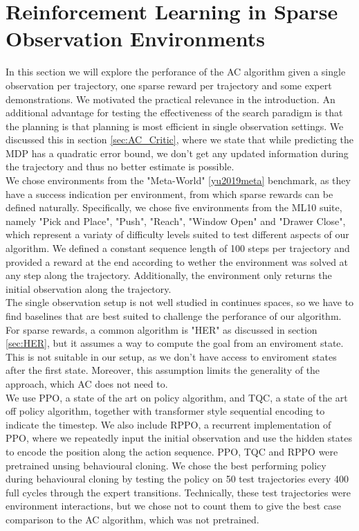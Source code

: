 \section{Reinforcement Learning in Sparse Observation Environments}
In this section we will explore the perforance of the AC algorithm given a single observation per trajectory, one sparse reward per trajectory and some expert demonstrations.  
We motivated the practical relevance in the introduction. An additional advantage for testing the effectiveness of the search paradigm is that the planning is that planning is most efficient in 
single observation settings. 
We discussed this in section \ref{sec:AC_Critic}, where we state that while predicting the MDP has a quadratic error bound, we don't get any updated information 
during the trajectory and thus no better estimate is possible. \\

We chose environments from the "Meta-World" \ref{yu2019meta} benchmark, as they have a success indication per environment, from which sparse rewards can be defined naturally. 
Specifically, we chose five environments from the ML10 suite, namely "Pick and Place", "Push", "Reach", "Window Open" and "Drawer Close", which represent a variaty 
of difficulty levels suited to test different aspects of our algorithm. We defined a constant sequence length of 100 steps per trajectory and provided 
a reward at the end according to wether the environment was solved at any step along the trajectory. Additionally, the environment 
only returns the initial observation along the trajectory.\\

The single observation setup is not well studied in continues spaces, so we have to find baselines that are best suited to challenge the perforance of our algorithm. For sparse rewards, a common 
algorithm is "HER" as discussed in section \ref{sec:HER}, but it assumes a way to compute the goal from an enviroment state. This is not suitable in our setup, as we don't have access to enviroment 
states after the first state. Moreover, this assumption limits the generality of the approach, which AC does not need to. \\
We use PPO, a state of the art on 
policy algorithm, and TQC, a state of the art off policy algorithm, together with transformer style sequential encoding to indicate the timestep. We also include 
RPPO, a recurrent implementation of PPO, where we repeatedly input the initial observation and use the hidden states to encode the position along the action sequence. 
PPO, TQC and RPPO were pretrained unsing behavioural cloning. We chose the best performing policy during behavioural cloning by testing the policy on 50 test 
trajectories every 400 full cycles through the 
expert transitions. Technically, these test trajectories were environment interactions, but we chose not to count them to give the best case comparison to the AC algorithm, which was not pretrained.\\

